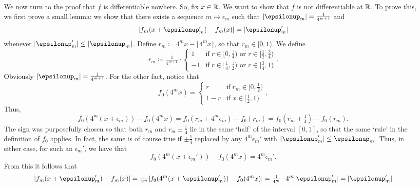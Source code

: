 \begin{exm}
\begin{savenotes}
We now turn to the proof that $f$ is differentiable nowhere.  So, fix $x\in \mathbb{R}$.  We want to show that $f$ is not differentiable at $\mathbb{R}$.  To prove this, we first prove a small lemma:  we show that there exists a sequence $m\mapsto \epsilon _m$ such that $\abs{\epsilon _m}=\frac{1}{4^{m+1}}$ and
\begin{equation}
\abs{f_m(x+\epsilon _m')-f_m(x)}=\abs{\epsilon _m'}
\end{equation}
whenever $\abs{\epsilon _m'}\leq \abs{\epsilon _m}$.  Define $r_m\coloneqq 4^mx-\lfloor 4^mx\rfloor$, so that $r_m\in [0,1)$.  We define
\begin{equation}
\epsilon _m\coloneqq \tfrac{1}{4^{m+1}}\cdot \begin{cases}1 & \text{if }r\in [0,\tfrac{1}{4})\text{ or }r\in [\tfrac{1}{2},\tfrac{3}{4}) \\ -1 & \text{if }r\in [\tfrac{1}{4},\tfrac{1}{2})\text{ or }r\in [\tfrac{3}{4},1)\end{cases}.
\end{equation}
Obviously $\abs{\epsilon _m}=\frac{1}{4^{m+1}}$.  For the other fact, notice that
\begin{equation}
f_0(4^mx)=\begin{cases}r & \text{if }r_m\in [0,\tfrac{1}{2}) \\ 1-r & \text{if }x\in [\tfrac{1}{2},1)\end{cases},
\end{equation}
Thus,
\begin{equation}
f_0(4^m(x+\epsilon _m))-f_0(4^mx)=f_0(r_m+4^m\epsilon _m)-f_0(r_m)=f_0(r_m\pm \tfrac{1}{4})-f_0(r_m).
\end{equation}
The sign was purposefully chosen so that both $r_m$ and $r_m\pm \frac{1}{4}$ lie in the same `half' of the interval $[0,1]$, so that the same `rule' in the definition of $f_0$ applies.  In fact, the same is of course true if $\pm \tfrac{1}{4}$ replaced by any $4^m\epsilon _m'$ with $\abs{\epsilon _m'}\leq \epsilon _m$.  Thus, in either case, for such an $\epsilon _m'$, we have that
\begin{equation}
f_0(4^m(x+\epsilon _m'))-f_0(4^mx)=4^m\epsilon _m'.
\end{equation}
From this it follows that
\begin{equation}
\abs{f_m(x+\epsilon _m')-f_m(x)}=\tfrac{1}{4^m}\abs{f_0(4^m(x+\epsilon _m'))-f_0(4^mx)}=\tfrac{1}{4^m}\cdot 4^m\abs{\epsilon _m'}=\abs{\epsilon _m'}
\end{equation}


\end{savenotes}
\end{exm}
